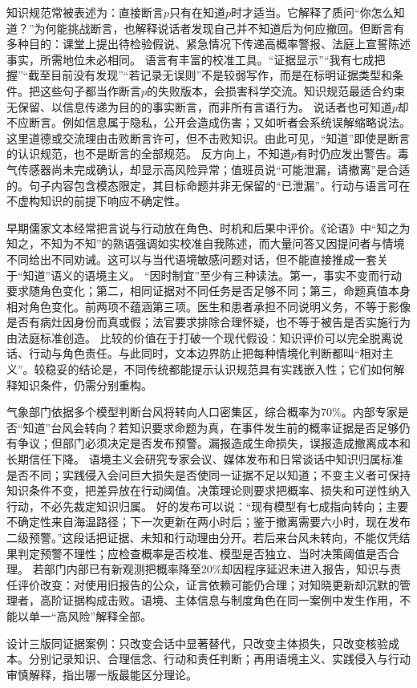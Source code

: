 知识规范常被表述为：直接断言$p$只有在知道$p$时才适当。它解释了质问“你怎么知道？”为何能挑战断言，也解释说话者发现自己并不知道后为何应撤回。但断言有多种目的：课堂上提出待检验假说、紧急情况下传递高概率警报、法庭上宣誓陈述事实，所需地位未必相同。 语言有丰富的校准工具。“证据显示”“我有七成把握”“截至目前没有发现”“若记录无误则”不是较弱写作，而是在标明证据类型和条件。把这些句子都当作断言$p$的失败版本，会损害科学交流。知识规范最适合约束无保留、以信息传递为目的的事实断言，而非所有言语行为。 说话者也可知道$p$却不应断言。例如信息属于隐私，公开会造成伤害；又如听者会系统误解缩略说法。这里道德或交流理由击败断言许可，但不击败知识。由此可见，“知道”即使是断言的认识规范，也不是断言的全部规范。 反方向上，不知道$p$有时仍应发出警告。毒气传感器尚未完成确认，却显示高风险异常；值班员说“可能泄漏，请撤离”是合适的。句子内容包含模态限定，其目标命题并非无保留的“已泄漏”。行动与语言可在不虚构知识的前提下响应不确定性。

早期儒家文本经常把言说与行动放在角色、时机和后果中评价。《论语》中“知之为知之，不知为不知”的熟语强调如实校准自我陈述，而大量问答又因提问者与情境不同给出不同劝诫\parencite[2.17]{analects2003}。这可以与当代语境敏感问题对话，但不能直接推成一套关于“知道”语义的语境主义。 “因时制宜”至少有三种读法。第一，事实不变而行动要求随角色变化；第二，相同证据对不同任务是否足够不同；第三，命题真值本身相对角色变化。前两项不蕴涵第三项。医生和患者承担不同说明义务，不等于影像是否有病灶因身份而真或假；法官要求排除合理怀疑，也不等于被告是否实施行为由法庭标准创造。 比较的价值在于打破一个现代假设：知识评价可以完全脱离说话、行动与角色责任。与此同时，文本边界防止把每种情境化判断都叫“相对主义”。较稳妥的结论是，不同传统都能提示认识规范具有实践嵌入性；它们如何解释知识条件，仍需分别重构。

气象部门依据多个模型判断台风将转向人口密集区，综合概率为70\%。内部专家是否“知道”台风会转向？若知识要求命题为真，在事件发生前的概率证据是否足够仍有争议；但部门必须决定是否发布预警。漏报造成生命损失，误报造成撤离成本和长期信任下降。 语境主义会研究专家会议、媒体发布和日常谈话中知识归属标准是否不同；实践侵入会问巨大损失是否使同一证据不足以知道；不变主义者可保持知识条件不变，把差异放在行动阈值。决策理论则要求把概率、损失和可逆性纳入行动，不必先裁定知识归属。 好的发布可以说：“现有模型有七成指向转向；主要不确定性来自海温路径；下一次更新在两小时后；鉴于撤离需要六小时，现在发布二级预警。”这段话把证据、未知和行动理由分开。若后来台风未转向，不能仅凭结果判定预警不理性；应检查概率是否校准、模型是否独立、当时决策阈值是否合理。 若部门内部已有新观测把概率降至20\%却因程序延迟未进入报告，知识与责任评价改变：对使用旧报告的公众，证言依赖可能仍合理；对知晓更新却沉默的管理者，高阶证据构成击败。语境、主体信息与制度角色在同一案例中发生作用，不能以单一“高风险”解释全部。

\begin{tcolorbox}[breakable,colback=white,colframe=blue!30!black,title={本章研读任务},fonttitle=\bfseries]
设计三版同证据案例：只改变会话中显著替代，只改变主体损失，只改变核验成本。分别记录知识、合理信念、行动和责任判断；再用语境主义、实践侵入与行动审慎解释，指出哪一版最能区分理论。
\end{tcolorbox}

